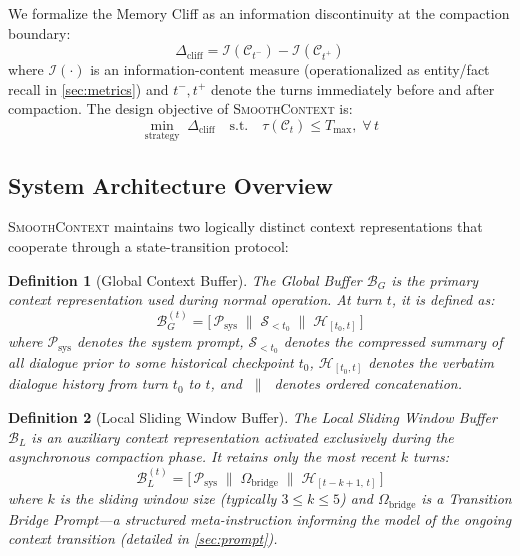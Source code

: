 \documentclass[10pt,twocolumn]{article}
\newtheorem{definition}{Definition}
\newcommand{\sys}{\textsc{SmoothContext}}
\newcommand{\bufG}{\mathcal{B}_G}
\newcommand{\bufL}{\mathcal{B}_L}
\newcommand{\psys}{\mathcal{P}_{\mathrm{sys}}}
\newcommand{\Dtok}{\tau}
\newcommand{\Tmax}{T_{\max}}
\newcommand{\concat}{\;\|\;}
\begin{document}
We formalize the Memory Cliff as an information discontinuity at the compaction boundary:
\begin{equation}\label{eq:cliff}
  \Delta_{\mathrm{cliff}} = \mathcal{I}(\mathcal{C}_{t^{-}}) - \mathcal{I}(\mathcal{C}_{t^{+}})
\end{equation}
where $\mathcal{I}(\cdot)$ is an information-content measure (operationalized as entity/fact recall in \cref{sec:metrics}) and $t^{-}, t^{+}$ denote the turns immediately before and after compaction. The design objective of \sys{} is:
\begin{equation}\label{eq:objective}
  \min_{\text{strategy}} \; \Delta_{\mathrm{cliff}} \quad \text{s.t.} \quad \Dtok(\mathcal{C}_t) \leq \Tmax, \; \forall\, t
\end{equation}

\subsection{System Architecture Overview}\label{sec:architecture}

\sys{} maintains two logically distinct context representations that cooperate through a state-transition protocol:

\begin{definition}[Global Context Buffer]\label{def:global}
  The \emph{Global Buffer} $\bufG$ is the primary context representation used during normal operation. At turn $t$, it is defined as:
  \begin{equation}\label{eq:bufg}
    \bufG^{(t)} = \bigl[\, \psys \concat \mathcal{S}_{< t_0} \concat \mathcal{H}_{[t_0, t]} \,\bigr]
  \end{equation}
  where $\psys$ denotes the system prompt, $\mathcal{S}_{< t_0}$ denotes the compressed summary of all dialogue prior to some historical checkpoint $t_0$, $\mathcal{H}_{[t_0, t]}$ denotes the verbatim dialogue history from turn $t_0$ to $t$, and $\concat$ denotes ordered concatenation.
\end{definition}

\begin{definition}[Local Sliding Window Buffer]\label{def:local}
  The \emph{Local Sliding Window Buffer} $\bufL$ is an auxiliary context representation activated exclusively during the asynchronous compaction phase. It retains only the most recent $k$ turns:
  \begin{equation}\label{eq:bufl}
    \bufL^{(t)} = \bigl[\, \psys \concat \Omega_{\mathrm{bridge}} \concat \mathcal{H}_{[t-k+1,\, t]} \,\bigr]
  \end{equation}
  where $k$ is the sliding window size (typically $3 \leq k \leq 5$) and $\Omega_{\mathrm{bridge}}$ is a \emph{Transition Bridge Prompt}---a structured meta-instruction informing the model of the ongoing context transition (detailed in \cref{sec:prompt}).
\end{definition}
\end{document}

